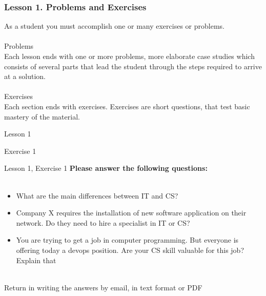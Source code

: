 \documentclass[aspectratio=1610]{beamer}
\begin{document}

\begin{frame}
\frametitle{Lesson 1. Problems and Exercises}
\LARGE
As a student you must accomplish one or many exercises or problems.\\~\\
\Large \alert{Problems}\\
Each lesson ends with one or more problems, more elaborate case studies which consists of several parts that lead the student through the steps required to arrive at a solution.
\\~\\ 
\Large \alert{Exercises} \\
Each section ends with exercises. Exercises are short questions, that test basic mastery of the material.
\end{frame}

\begin{frame}{Lesson 1}{}
\begin{center}
\Huge Exercise 1
\end{center}
\end{frame}

\begin{frame}{Lesson 1, Exercise 1}{}
\Large
\textbf{Please answer the following questions:}\\~\\ 

\Large{
\begin{itemize}
    \item What are the main differences between IT and CS?
    \item Company X requires the installation of new software application on their network. Do they need to hire a specialist in IT or CS?
    \item You are trying to get a job in computer programming. But everyone is offering today a devops position. Are your CS skill valuable for this job? Explain that\\~\\
\end{itemize}}

Return in writing the answers by email, in text format or PDF
\end{frame}
\end{document}
